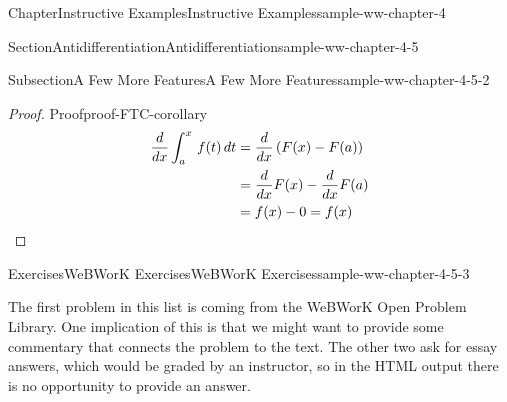 \documentclass[oneside,10pt,]{book}
\newcommand{\blocktitlefont}{\relax}
\newcommand{\xreffont}{\relax}
\newlength{\fillinmaxwidth}
\newlength{\fillincontract}
\newlength{\charmaxwidth}\setlength{\charmaxwidth}{0.5em}
\newlength{\charminwidth}\setlength{\charminwidth}{0.1em}
\newlength{\fillinheight}
\newcommand{\fillintext}[1]{%
\setlength{\fillinmaxwidth}{#1\charmaxwidth}%
\setlength{\fillincontract}{#1\charminwidth}%
\setlength{\fillinheight}{\baselineskip}\addtolength{\fillinheight}{1.2pt}%
\strut\nobreak\leaders\vbox{\hrule width 0.3pt height 0.3pt \vskip -1.2pt}\hskip 1\fillinmaxwidth minus \fillincontract\nobreak\strut%
}
\numberwithin{equation}{section}
\newcommand{\definiteintegral}[4]{\int_{#1}^{#2}\,#3\,d#4}
\newcommand{\amp}{&}
\begin{document}
\begin{chapterptx}{Chapter}{Instructive Examples}{}{Instructive Examples}{}{}{sample-ww-chapter-4}
\begin{sectionptx}{Section}{Antidifferentiation}{}{Antidifferentiation}{}{}{sample-ww-chapter-4-5}
\begin{subsectionptx}{Subsection}{A Few More Features}{}{A Few More Features}{}{}{sample-ww-chapter-4-5-2}
\begin{proof}{Proof}{}{proof-FTC-corollary}
\begin{align}
\frac{d}{dx}\definiteintegral{a}{x}{f(t)}{t}&=\frac{d}{dx}\left(F(x)-F(a)\right)\label{equation-use-FTC}\\
&=\frac{d}{dx}F(x)-\frac{d}{dx}F(a)\notag\\
&=f(x)-0 = f(x)\label{proof-FTC-corollary-1-3-3}
\end{align}
%
\end{proof}
\end{subsectionptx}
%
%
\typeout{************************************************}
\typeout{************************************************}
%
\begin{exercises-subsection}{Exercises}{WeBWorK Exercises}{}{WeBWorK Exercises}{}{}{sample-ww-chapter-4-5-3}
\begin{introduction}{}%
The first problem in this list is coming from the WeBWorK Open Problem Library. One implication of this is that we might want to provide some commentary that connects the problem to the text.  The other two ask for essay answers, which would be graded by an instructor, so in the HTML output there is no opportunity to provide an answer.%
\end{introduction}%
\end{exercises-subsection}
\end{sectionptx}
\end{chapterptx}
\end{document}
